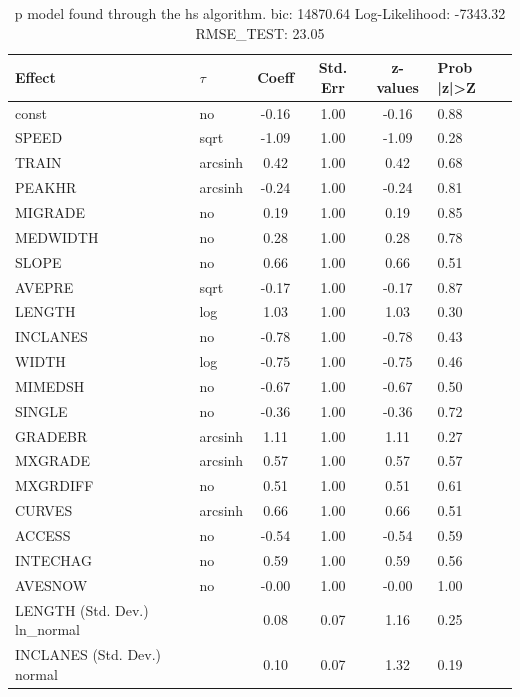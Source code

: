 \begin{table}
	\caption{p model found through the hs algorithm. bic: 14870.64 Log-Likelihood: -7343.32 RMSE_TEST: 23.05}
	\begin{center}
		\begin{tabular}{|l|l|c|c|c|l|}
			\hline
			Effect & $\tau$ & Coeff & Std. Err & z-values & Prob |z|>Z \\
			\hline
			const & no & -0.16 & 1.00 & -0.16 & 0.88 \\
			\hline
			SPEED & sqrt & -1.09 & 1.00 & -1.09 & 0.28 \\
			\hline
			TRAIN & arcsinh & 0.42 & 1.00 & 0.42 & 0.68 \\
			\hline
			PEAKHR & arcsinh & -0.24 & 1.00 & -0.24 & 0.81 \\
			\hline
			MIGRADE & no & 0.19 & 1.00 & 0.19 & 0.85 \\
			\hline
			MEDWIDTH & no & 0.28 & 1.00 & 0.28 & 0.78 \\
			\hline
			SLOPE & no & 0.66 & 1.00 & 0.66 & 0.51 \\
			\hline
			AVEPRE & sqrt & -0.17 & 1.00 & -0.17 & 0.87 \\
			\hline
			LENGTH & log & 1.03 & 1.00 & 1.03 & 0.30 \\
			\hline
			INCLANES & no & -0.78 & 1.00 & -0.78 & 0.43 \\
			\hline
			WIDTH & log & -0.75 & 1.00 & -0.75 & 0.46 \\
			\hline
			MIMEDSH & no & -0.67 & 1.00 & -0.67 & 0.50 \\
			\hline
			SINGLE & no & -0.36 & 1.00 & -0.36 & 0.72 \\
			\hline
			GRADEBR & arcsinh & 1.11 & 1.00 & 1.11 & 0.27 \\
			\hline
			MXGRADE & arcsinh & 0.57 & 1.00 & 0.57 & 0.57 \\
			\hline
			MXGRDIFF & no & 0.51 & 1.00 & 0.51 & 0.61 \\
			\hline
			CURVES & arcsinh & 0.66 & 1.00 & 0.66 & 0.51 \\
			\hline
			ACCESS & no & -0.54 & 1.00 & -0.54 & 0.59 \\
			\hline
			INTECHAG & no & 0.59 & 1.00 & 0.59 & 0.56 \\
			\hline
			AVESNOW & no & -0.00 & 1.00 & -0.00 & 1.00 \\
			\hline
			LENGTH (Std. Dev.) ln_normal &  & 0.08 & 0.07 & 1.16 & 0.25 \\
			\hline
			INCLANES (Std. Dev.) normal &  & 0.10 & 0.07 & 1.32 & 0.19 \\

\end{tabular}
\end{center}
\end{table}
